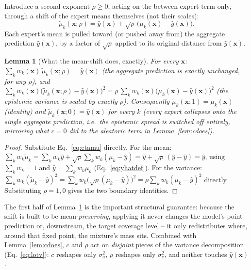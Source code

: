\documentclass[11pt]{article}
\newtheorem{lemma}{Lemma}[section]
\begin{document}
Introduce a second exponent $\rho \ge 0$, acting on the between-expert term only, through a shift
of the expert means themselves (not their scales):
\begin{equation}
\tilde\mu_k(\bm x;\rho) = \hat y(\bm x) + \sqrt\rho\,\big(\mu_k(\bm x) - \hat y(\bm x)\big).
\label{eq:etamu}
\end{equation}
Each expert's mean is pulled toward (or pushed away from) the aggregate prediction $\hat y(\bm x)$,
by a factor of $\sqrt\rho$ applied to its original distance from $\hat y(\bm x)$.

\begin{lemma}[What the mean-shift does, exactly]
\label{lem:etashift}
For every $\bm x$: $\sum_k w_k(\bm x)\,\tilde\mu_k(\bm x;\rho) = \hat y(\bm x)$ (the aggregate
prediction is exactly unchanged, for \emph{any} $\rho$), and $\sum_k w_k(\bm x)\big(\tilde\mu_k(\bm
x;\rho) - \hat y(\bm x)\big)^2 = \rho\,\sum_k w_k(\bm x)\big(\mu_k(\bm x)-\hat y(\bm x)\big)^2$
(the epistemic variance is scaled by exactly $\rho$). Consequently $\tilde\mu_k(\bm x;1)=\mu_k(\bm
x)$ (identity) and $\tilde\mu_k(\bm x;0)=\hat y(\bm x)$ for every $k$ (every expert collapses onto
the single aggregate prediction, i.e.\ the epistemic spread is switched off entirely, mirroring
what $c=0$ did to the aleatoric term in Lemma~\ref{lem:cdoes}).
\end{lemma}
\begin{proof}
Substitute Eq.~\eqref{eq:etamu} directly. For the mean: $\sum_k w_k\tilde\mu_k = \sum_k w_k\hat y +
\sqrt\rho\sum_k w_k(\mu_k-\hat y) = \hat y + \sqrt\rho\,(\hat y-\hat y) = \hat y$, using $\sum_k
w_k=1$ and $\hat y=\sum_k w_k\mu_k$ (Eq.~\ref{eq:yhatdef}). For the variance:
$\sum_k w_k(\tilde\mu_k-\hat y)^2 = \sum_k w_k\big(\sqrt\rho(\mu_k-\hat y)\big)^2 = \rho\sum_k
w_k(\mu_k-\hat y)^2$ directly. Substituting $\rho=1,0$ gives the two boundary identities.
\end{proof}

The first half of Lemma~\ref{lem:etashift} is the important structural guarantee: because the
shift is built to be mean-\emph{preserving}, applying it never changes the model's point
prediction or, downstream, the target coverage level -- it only redistributes where, around that
fixed point, the mixture's mass sits. Combined with Lemma~\ref{lem:cdoes}, $c$ and $\rho$ act on
\emph{disjoint} pieces of the variance decomposition (Eq.~\ref{eq:lotv}): $c$ reshapes only
$\sigma_a^2$, $\rho$ reshapes only $\sigma_e^2$, and neither touches $\hat y(\bm x)$.
\end{document}
